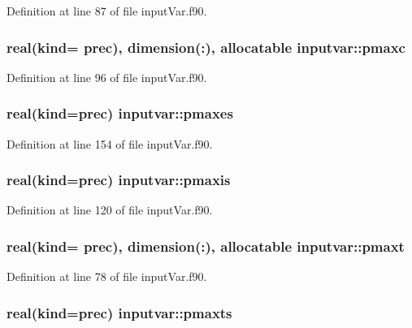 Definition at line 87 of file input\-Var.\-f90.

\hypertarget{classinputvar_a93b555571bee30038d48c86de7ab5c14}{
\subsubsection[{pmaxc}]{\setlength{\rightskip}{0pt plus 5cm}real(kind= prec), dimension(\-:), allocatable inputvar\-::pmaxc}}\label{classinputvar_a93b555571bee30038d48c86de7ab5c14}


Definition at line 96 of file input\-Var.\-f90.

\hypertarget{classinputvar_a424224e3c5687c72c624fa212df200b4}{
\subsubsection[{pmaxes}]{\setlength{\rightskip}{0pt plus 5cm}real(kind=prec) inputvar\-::pmaxes}}\label{classinputvar_a424224e3c5687c72c624fa212df200b4}


Definition at line 154 of file input\-Var.\-f90.

\hypertarget{classinputvar_a75e1360d9c427fd4f7270abee815328b}{
\subsubsection[{pmaxis}]{\setlength{\rightskip}{0pt plus 5cm}real(kind=prec) inputvar\-::pmaxis}}\label{classinputvar_a75e1360d9c427fd4f7270abee815328b}


Definition at line 120 of file input\-Var.\-f90.

\hypertarget{classinputvar_a0a9434332c855a12ef886b675af68d35}{
\subsubsection[{pmaxt}]{\setlength{\rightskip}{0pt plus 5cm}real(kind= prec), dimension(\-:), allocatable inputvar\-::pmaxt}}\label{classinputvar_a0a9434332c855a12ef886b675af68d35}


Definition at line 78 of file input\-Var.\-f90.

\hypertarget{classinputvar_a6301e249eea800b1c3052280fce007b2}{
\subsubsection[{pmaxts}]{\setlength{\rightskip}{0pt plus 5cm}real(kind=prec) inputvar\-::pmaxts}}\label{classinputvar_a6301e249eea800b1c3052280fce007b2}


